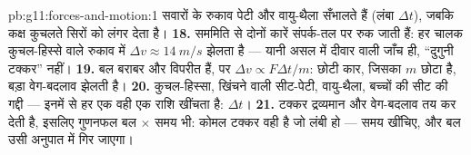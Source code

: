 \begin{solution}{pb:g11:forces-and-motion:1}
सवारों के रुकाव पेटी और वायु-थैला सँभालते हैं (लंबा $\Delta t$), जबकि कक्ष
कुचलते सिरों को लंगर देता है।
\textbf{18.} सममिति से दोनों कारें संपर्क-तल पर रुक जाती हैं: हर चालक
कुचल-हिस्से वाले रुकाव में $\Delta v \approx \qty{14}{m/s}$ झेलता है --- यानी असल में दीवार वाली जाँच
ही, ``दुगुनी टक्कर'' नहीं।
\textbf{19.} बल बराबर और विपरीत हैं, पर $\Delta v \propto F\Delta t/m$: छोटी कार, जिसका
$m$ छोटा है, बड़ा वेग-बदलाव झेलती है।
\textbf{20.} कुचल-हिस्सा, खिंचने वाली सीट-पेटी, वायु-थैला, बच्चों की सीट की
गद्दी --- इनमें से हर एक वही एक राशि खींचता है: $\Delta t$।
\textbf{21.} टक्कर द्रव्यमान और वेग-बदलाव तय कर देती है, इसलिए गुणनफल
बल $\times$ समय भी: कोमल टक्कर वही है जो लंबी हो --- समय खींचिए, और
बल उसी अनुपात में गिर जाएगा।
\end{solution}

